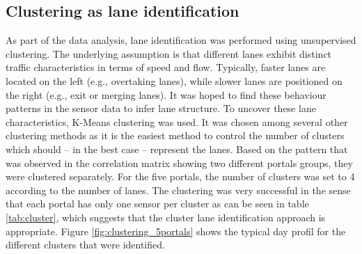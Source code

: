 	\subsection{Clustering as lane identification} \label{chap:clustering}
	As part of the data analysis, lane identification was performed using unsupervised clustering.
	The underlying assumption is that different lanes exhibit distinct traffic characteristics in terms of speed and flow. Typically, faster lanes are located on the left (e.g., overtaking lanes), while slower lanes are positioned on the right (e.g., exit or merging lanes). It was hoped to find these behaviour patterns in the sensor data to infer lane structure.
	To uncover these lane characteristics, K-Means clustering was used. It was chosen among several other clustering methods as it is the easiest method to control the number of clusters which should -- in the best case -- represent the lanes.
	Based on the pattern that was observed in the correlation matrix showing two different portals groups, they were clustered separately. \newline 
	For the five portals, the number of clusters was set to 4 according to the number of lanes.
	The clustering was very successful in the sense that each portal has only one sensor per cluster as can be seen in table \ref{tab:cluster}, which suggests that the cluster lane identification approach is appropriate. 
	\noindent Figure \ref{fig:clustering_5portals} shows the typical day profil for the different clusters that were identified.
